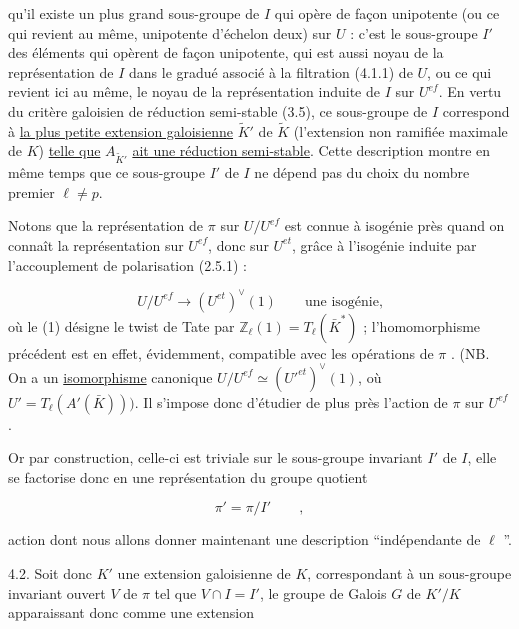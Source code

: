
qu'il existe un plus grand sous-groupe de $I$ qui opère de façon unipotente (ou ce qui revient au même, unipotente d'échelon deux) sur $U$ : c'est le sous-groupe $I'$ des éléments qui opèrent de façon unipotente, qui est aussi noyau de la représentation de $I$ dans le gradué associé à la filtration (4.1.1) de $U$, ou ce qui revient ici au même, le noyau de la représentation induite de $I$ sur $U^{ef}$. En vertu du critère galoisien de réduction semi-stable (3.5), ce sous-groupe de $I$ correspond à \underline{la plus petite extension galoisienne} $\tilde{K}'$ de $\tilde{K}$ (l'extension non ramifiée maximale de $K$) \underline{telle que} $A_{\tilde{K}'}$ \underline{ait une réduction semi-stable}. Cette description montre en même temps que ce sous-groupe $I'$ de $I$ ne dépend pas du choix du nombre premier $\ell \neq p$.

Notons que la représentation de $\pi$ sur $U/U^{ef}$ est connue à isogénie près quand on connaît la représentation sur $U^{ef}$, donc sur $U^{et}$, grâce à l'isogénie induite par l'accouplement de polarisation (2.5.1) :

\begin{equation}\tag{4.1.2}
U/U^{ef} \longrightarrow (U^{et})^{\vee}(1) \qquad \mbox{une isogénie,}
\end{equation}
où le (1) désigne le twist de Tate par $\mathbb{Z}_\ell(1) = T_\ell(\bar{K}^*)$ ; l'homomorphisme précédent est en effet, évidemment, compatible avec les opérations de $\pi$ . (NB. On a un \underline{isomorphisme} canonique $U/U^{ef} \simeq ({U'}^{et})^{\vee} (1)$, où $U' = T_\ell(A'(\bar{K})))$. Il s'impose donc d'étudier de plus près l'action de $\pi$ sur $U^{ef}$.

Or par construction, celle-ci est triviale sur le sous-groupe invariant $I'$ de $I$, elle se factorise donc en une représentation du groupe quotient

\begin{equation}\tag{4.1.3}
\pi' = \pi/I' \qquad ,
\end{equation}


action dont nous allons donner maintenant une description ``indépendante de $\ell$ ''.

4.2. Soit donc $K'$ une extension galoisienne de $K$, correspondant à un sous-groupe invariant ouvert $V$ de $\pi$ tel que $V \cap I = I'$, le groupe de Galois $G$ de $K'/K$ apparaissant donc comme une extension

